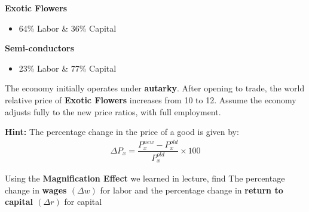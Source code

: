 \documentclass[12pt]{exam}
\begin{document}
\begin{questions}
\begin{multicols}{2}
  \centering 
  \textbf{Exotic Flowers}
  \begin{itemize}
    \item 64\% Labor \& 36\% Capital 
  \end{itemize}
  
  \columnbreak
  
  \centering
  \textbf{Semi-conductors}
  \begin{itemize}
    \item 23\% Labor \& 77\% Capital
  \end{itemize}
  \end{multicols}

The economy initially operates under \textbf{autarky}. 
After opening to trade, the world relative price of \textbf{Exotic Flowers} increases from 10 to 12. 
Assume the economy adjusts fully to the new price ratios, with full employment. 

\textbf{Hint:} 
The percentage change in the price of a good is given by:
\begin{align*}
  \Delta P_{x} = \dfrac{P_{x}^{new} - P_{x}^{old}}{P_{x}^{old}} \times 100
\end{align*}

Using the \textbf{Magnification Effect} we learned in lecture, find The percentage change in \textbf{wages $(\Delta w)$} for labor and the percentage change in \textbf{return to capital $(\Delta r)$} for capital

\end{questions}
\end{document}
